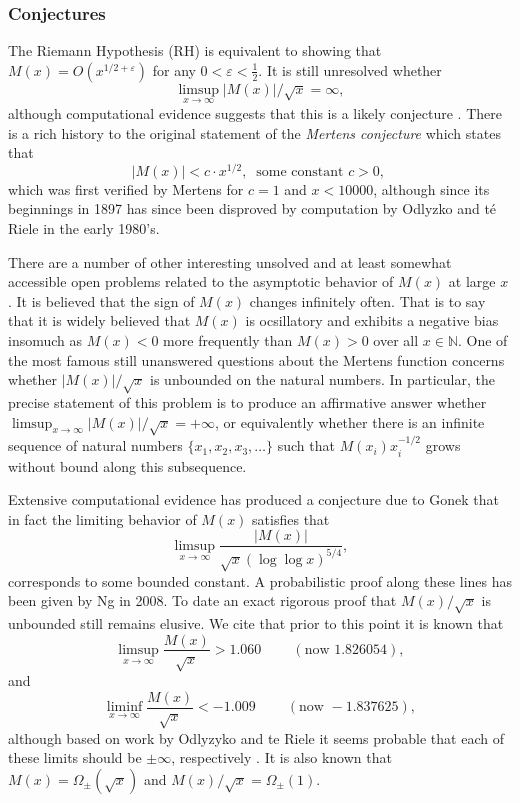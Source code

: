 \documentclass[11pt,reqno,a4letter]{article}
\numberwithin{figure}{section}
\numberwithin{table}{section}
\newcommand{\cf}{\textit{cf.\ }}
\theoremstyle{plain}
\numberwithin{theorem}{section}
\theoremstyle{definition}
\begin{document}
\subsubsection{Conjectures} 

The Riemann Hypothesis (RH) is equivalent to showing that 
$M(x) = O\left(x^{1/2+\varepsilon}\right)$ for any 
$0 < \varepsilon < \frac{1}{2}$. 
It is still unresolved whether 
\[ 
\limsup_{x\rightarrow\infty} |M(x)| / \sqrt{x} = \infty, 
\] 
although computational evidence suggests that this is a likely conjecture 
\cite{ORDER-MERTENSFN,HURST-2017}. 
There is a rich history to the original statement of the \emph{Mertens conjecture} which 
states that 
\[ 
|M(x)| < c \cdot x^{1/2},\ \text{ some constant $c > 0$, }
\] 
which was first verified by Mertens for $c = 1$ and $x < 10000$, 
although since its beginnings in 1897 has since been disproved by computation by 
Odlyzko and t\'{e} Riele in the early 1980's. 

There are a number of other interesting unsolved and at 
least somewhat accessible open problems 
related to the asymptotic behavior of $M(x)$ at large $x$. 
It is believed that the sign of $M(x)$ changes infinitely often. 
That is to say that it is widely believed that $M(x)$ is 
ocsillatory and exhibits a negative bias insomuch as 
$M(x) < 0$ more frequently than $M(x) > 0$ over all 
$x \in \mathbb{N}$. 
One of the most famous still unanswered questions about the Mertens 
function concerns whether $|M(x)| / \sqrt{x}$ is unbounded on the 
natural numbers. In particular, the precise statement of this 
problem is to produce an affirmative answer whether 
$\limsup_{x \rightarrow \infty} |M(x)| / \sqrt{x} = +\infty$, or 
equivalently whether there is an infinite sequence of natural numbers 
$\{x_1, x_2, x_3, \ldots\}$ such that $M(x_i) x_i^{-1/2}$ grows without 
bound along this subsequence. 

Extensive computational evidence has produced 
a conjecture due to Gonek that in fact the limiting behavior of 
$M(x)$ satisfies 
that $$\limsup_{x \rightarrow \infty} \frac{|M(x)|}{\sqrt{x} 
(\log\log x)^{5/4}},$$ 
corresponds to some bounded constant. 
A probabilistic proof along these 
lines has been given by Ng in 2008. To date an exact rigorous 
proof that $M(x) / \sqrt{x}$ is unbounded still remains elusive. 
We cite that prior to this point it is known that \cite[\cf \S 4.1]{PRIMEREC} 
\[
\limsup_{x\rightarrow\infty} \frac{M(x)}{\sqrt{x}} > 1.060\ \qquad (\text{now } 1.826054), 
\] 
and 
\[ 
\liminf_{x\rightarrow\infty} \frac{M(x)}{\sqrt{x}} < -1.009\ \qquad (\text{now } -1.837625), 
\] 
although based on work by Odlyzyko and te Riele it seems probable that 
each of these limits should be $\pm \infty$, respectively 
\cite{ODLYZ-TRIELE,MREVISITED,ORDER-MERTENSFN,HURST-2017}. 
It is also known that $M(x) = \Omega_{\pm}(\sqrt{x})$ and 
$M(x) / \sqrt{x} = \Omega_{\pm}(1)$. 
\end{document}
